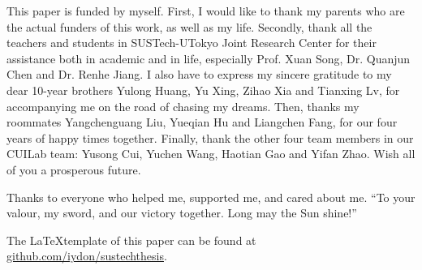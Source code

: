
This paper is funded by myself. First, I would like to thank my parents who are the actual funders of this work, as well as my life. Secondly, thank all the teachers and students in SUSTech-UTokyo Joint Research Center for their assistance both in academic and in life, especially Prof. Xuan Song, Dr. Quanjun Chen and Dr. Renhe Jiang. I also have to express my sincere gratitude to my dear 10-year brothers Yulong Huang, Yu Xing, Zihao Xia and Tianxing Lv, for accompanying me on the road of chasing my dreams. Then, thanks my roommates Yangchenguang Liu, Yueqian Hu and Liangchen Fang, for our four years of happy times together. Finally, thank the other four team members in our CUILab team: Yusong Cui, Yuchen Wang, Haotian Gao and Yifan Zhao. Wish all of you a prosperous future.

Thanks to everyone who helped me, supported me, and cared about me. ``To your valour, my sword, and our victory together. Long may the Sun shine!''

\vspace{\baselineskip}

The \LaTeX template of this paper can be found at \href{https://github.com/iydon/sustechthesis}{github.com/iydon/sustechthesis}.